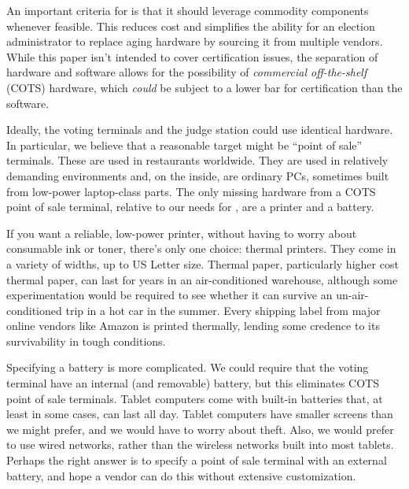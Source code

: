 An important criteria for \projname is that it should leverage commodity components whenever feasible. This reduces cost and simplifies the ability for an election administrator to replace aging hardware by sourcing it from multiple vendors. While this paper isn't intended to cover certification issues, the separation of hardware and software allows for the possibility of {\em commercial off-the-shelf} (COTS) hardware, which {\em could} be subject to a lower bar for certification than the software.

Ideally, the voting terminals and the judge station could use identical hardware. In particular, we believe that a reasonable target might be ``point of sale'' terminals. These are used in restaurants worldwide. They are used in relatively demanding environments and, on the inside, are ordinary PCs, sometimes built from low-power laptop-class parts. The only missing hardware from a COTS point of sale terminal, relative to our needs for \projname, are a printer and a battery.

If you want a reliable, low-power printer, without having to worry about consumable ink or toner, there's only one choice: thermal printers. They come in a variety of widths, up to US Letter size. Thermal paper, particularly higher cost thermal paper, can last for years in an air-conditioned warehouse, although some experimentation would be required to see whether it can survive an un-air-conditioned trip in a hot car in the summer. Every shipping label from major online vendors like Amazon is printed thermally, lending some credence to its survivability in tough conditions.

Specifying a battery is more complicated. We could require that the voting terminal have an internal (and removable) battery, but this eliminates COTS point of sale terminals. Tablet computers come with built-in batteries that, at least in some cases, can last all day. Tablet computers have smaller screens than we might prefer, and we would have to worry about theft. Also, we would prefer to use wired networks, rather than the wireless networks built into most tablets. Perhaps the right answer is to specify a point of sale terminal with an external battery, and hope a vendor can do this without extensive customization.

